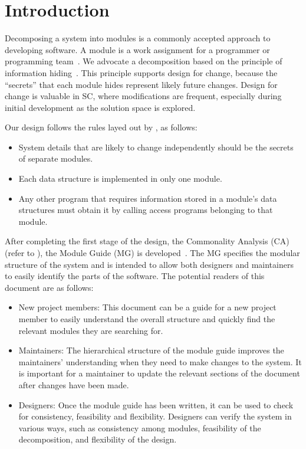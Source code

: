\documentclass[12pt, titlepage]{article}
\begin{document}
\newpage

\tableofcontents

\listoftables

\listoffigures

\newpage


\section{Introduction}

Decomposing a system into modules is a commonly accepted approach to developing
software.  A module is a work assignment for a programmer or programming
team~\citep{ParnasEtAl1984}.  We advocate a decomposition
based on the principle of information hiding~\citep{Parnas1972a}.  This
principle supports design for change, because the ``secrets'' that each module
hides represent likely future changes.  Design for change is valuable in SC,
where modifications are frequent, especially during initial development as the
solution space is explored.  

Our design follows the rules layed out by \citet{ParnasEtAl1984}, as follows:
\begin{itemize}
\item System details that are likely to change independently should be the
  secrets of separate modules.
\item Each data structure is implemented in only one module.
\item Any other program that requires information stored in a module's data
  structures must obtain it by calling access programs belonging to that module.
\end{itemize}

After completing the first stage of the design, the Commonality Analysis (CA)
(refer to \citet{LBM_CA_PM}), the Module Guide (MG) is
developed~\citep{ParnasEtAl1984}. The MG specifies the modular structure of the
system and is intended to allow both designers and maintainers to easily
identify the parts of the software.  The potential readers of this document are
as follows:

\begin{itemize}
\item New project members: This document can be a guide for a new project member
  to easily understand the overall structure and quickly find the
  relevant modules they are searching for.
\item Maintainers: The hierarchical structure of the module guide improves the
  maintainers' understanding when they need to make changes to the system. It is
  important for a maintainer to update the relevant sections of the document
  after changes have been made.
\item Designers: Once the module guide has been written, it can be used to
  check for consistency, feasibility and flexibility. Designers can verify the
  system in various ways, such as consistency among modules, feasibility of the
  decomposition, and flexibility of the design.
\end{itemize}
\end{document}
